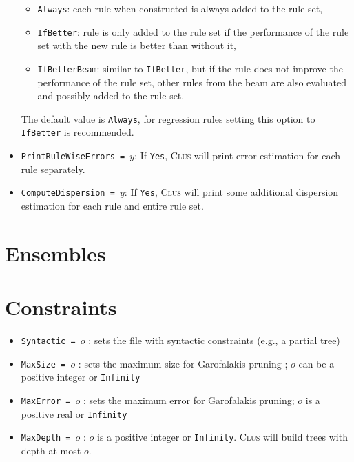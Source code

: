 \documentclass[a4paper]{report}
\newcommand{\clus}{\textsc{Clus}}
\begin{document}
\begin{itemize}
\begin{itemize}
		\item \texttt{Always}: each rule when constructed is always added to the rule set,
		\item \texttt{IfBetter}: rule is only added to the rule set if the performance of the rule set with the new rule is better than without it,
		\item \texttt{IfBetterBeam}: similar to \texttt{IfBetter}, but if the rule does not improve the performance of the rule set, other rules from the beam are also evaluated and possibly added to the rule set.
	\end{itemize}
	The default value is \texttt{Always}, for regression rules setting this option to \texttt{IfBetter} is recommended.
	\item \texttt{PrintRuleWiseErrors = $y$}: If \texttt{Yes},  \clus{} will print error estimation for each rule separately.
\item {\tt ComputeDispersion = $y$}: If \texttt{Yes},  \clus{} will print some additional dispersion estimation for each rule and entire rule set.
\end{itemize}


\section{Ensembles}

\section{Constraints}

\begin{itemize}
\item {\tt Syntactic = $o$} : sets the file with syntactic constraints (e.g., a partial tree) \cite{Struyf06-KDID:proc}
\item {\tt MaxSize = $o$} : sets the maximum size for Garofalakis pruning \cite{Garofalakis03:jrnl, Struyf06-KDID:proc}; $o$ can be a positive integer or {\tt Infinity}
\item {\tt MaxError = $o$} : sets the maximum error for Garofalakis pruning; $o$ is a positive real or {\tt Infinity}
\item {\tt MaxDepth = $o$} : $o$ is a positive integer or {\tt Infinity}. \clus{} will build trees with depth at most $o$.
\end{itemize}
\end{document}
